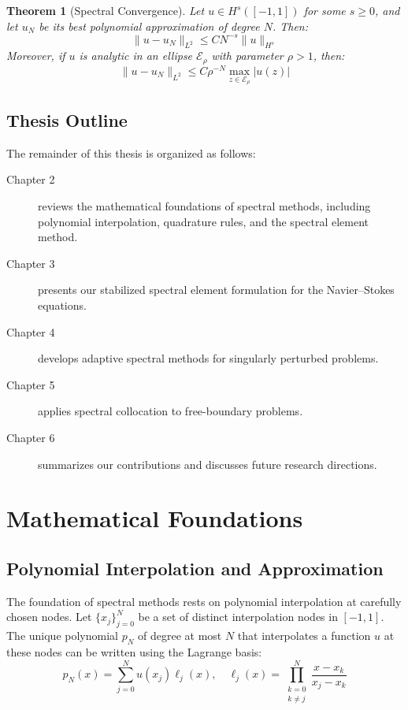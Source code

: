 \documentclass[12pt,a4paper,oneside]{report}
\newtheorem{theorem}{Theorem}[chapter]
\begin{document}
\begin{theorem}[Spectral Convergence]
Let $u \in H^s([-1,1])$ for some $s \geq 0$, and let $u_N$ be its best polynomial approximation of degree $N$. Then:
\begin{equation}
  \|u - u_N\|_{L^2} \leq C N^{-s} \|u\|_{H^s}
\end{equation}
Moreover, if $u$ is analytic in an ellipse $\mathcal{E}_\rho$ with parameter $\rho > 1$, then:
\begin{equation}
  \|u - u_N\|_{L^2} \leq C \rho^{-N} \max_{z \in \mathcal{E}_\rho} |u(z)|
\end{equation}
\end{theorem}

\section{Thesis Outline}

The remainder of this thesis is organized as follows:
\begin{description}
  \item[Chapter 2] reviews the mathematical foundations of spectral methods, including polynomial interpolation, quadrature rules, and the spectral element method.
  \item[Chapter 3] presents our stabilized spectral element formulation for the Navier--Stokes equations.
  \item[Chapter 4] develops adaptive spectral methods for singularly perturbed problems.
  \item[Chapter 5] applies spectral collocation to free-boundary problems.
  \item[Chapter 6] summarizes our contributions and discusses future research directions.
\end{description}

\chapter{Mathematical Foundations}
\label{ch:foundations}

\section{Polynomial Interpolation and Approximation}

The foundation of spectral methods rests on polynomial interpolation at carefully chosen nodes. Let $\{x_j\}_{j=0}^N$ be a set of distinct interpolation nodes in $[-1, 1]$. The unique polynomial $p_N$ of degree at most $N$ that interpolates a function $u$ at these nodes can be written using the Lagrange basis:
\begin{equation}
  p_N(x) = \sum_{j=0}^{N} u(x_j) \ell_j(x), \quad \ell_j(x) = \prod_{\substack{k=0 \\ k \neq j}}^{N} \frac{x - x_k}{x_j - x_k}
\end{equation}
\end{document}
